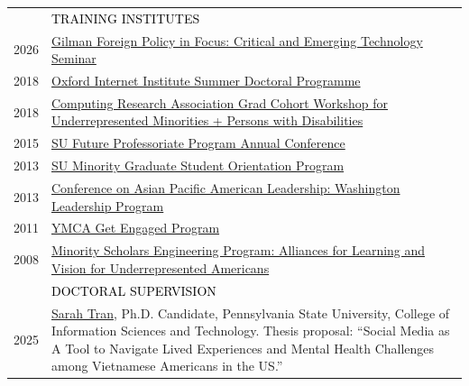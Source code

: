 \documentclass[12pt]{article}
\begin{document}
{\begin{longtable}{R{0.75in}p{5.0in}}
& \large \textcolor{black}{\uppercase{Training Institutes}}\\

\footnotesize{2026} & \href{https://web.archive.org/web/20260415072142/https://www.gilmanscholarship.org/program/gilman-foreign-policy-in-focus/}{Gilman Foreign Policy in Focus: Critical and Emerging Technology Seminar}\\

\footnotesize{2018} & \href{https://www.oii.ox.ac.uk/news-events/news/oii-sdp-cultivating-charismatic-cohorts/}{Oxford Internet Institute Summer Doctoral Programme}\\

\footnotesize{2018} & \href{https://cra.org/events/urmgradcohort/}{Computing Research Association Grad Cohort Workshop for Underrepresented Minorities + Persons with Disabilities}\\

\footnotesize{2015} & \href{https://graduateschool.syr.edu/current-students/future-professoriate-program/}{SU Future Professoriate Program Annual Conference}\\

\footnotesize{2013} & \href{https://web.archive.org/web/20240303190220/https://graduateschool.syr.edu/diversity-inclusion/}{SU Minority Graduate Student Orientation Program}\\

\footnotesize{2013} & \href{https://www.capal.org/programs/wlp/}{Conference on Asian Pacific American Leadership: Washington Leadership Program}\\

\footnotesize{2011} & \href{https://www.seattleymca.org/get-engaged-boards-commissions}{YMCA Get Engaged Program}\\

\footnotesize{2008} & \href{https://www.ncbi.nlm.nih.gov/pmc/articles/PMC4167726}{Minority Scholars Engineering Program: Alliances for Learning and Vision for Underrepresented Americans} \medskip \\ 

& \large \textcolor{black}{\uppercase{Doctoral Supervision}}\\

\footnotesize{2025} & \href{https://www.linkedin.com/in/sglt/}{Sarah Tran}, Ph.D. Candidate, Pennsylvania State University, College of Information Sciences and Technology. Thesis proposal: ``Social Media as A Tool to Navigate Lived Experiences and Mental Health Challenges among Vietnamese Americans in the US.''\\


\end{longtable}}
\end{document}
